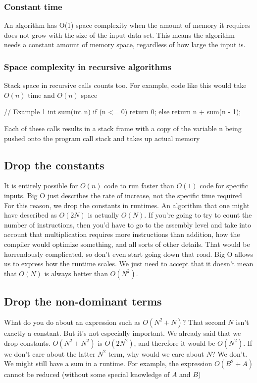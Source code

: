 \documentclass{report}
\begin{document}
    \subsubsection{Constant time}
    \bigbreak \noindent 
    An algorithm has O(1) space complexity when the amount of memory it requires does not grow with the size of the input data set. This means the algorithm needs a constant amount of memory space, regardless of how large the input is.

    \bigbreak \noindent 
    \subsubsection{Space complexity in recursive algorithms}
    \bigbreak \noindent 
    Stack space in recursive calls counts too. For example, code like this would take $O(n)$ time and $O(n)$ space
    \bigbreak \noindent 
    \begin{cppcode}
    // Example 1
    int sum(int n) {
    if (n <= 0) 
        return 0;
    else
        return n + sum(n - 1);
    }
    \end{cppcode}
    \bigbreak \noindent 
    Each of these calls results in a stack frame with a copy of the variable n being pushed onto the program call stack and takes up actual memory

    \pagebreak \bigbreak \noindent 
    \subsection{Drop the constants}
    \bigbreak \noindent 
    It is entirely possible for $O(n)$ code to run faster than $O(1)$ code for specific inputs. Big O just describes the rate of increase, not the specific time required
    \bigbreak \noindent 
    For this reason, we drop the constants in runtimes. An algorithm that one might have described as \(O(2N)\) is actually \(O(N)\). If you’re going to try to count the number of instructions, then you’d have to go to the assembly level and take into account that multiplication requires more instructions than addition, how the compiler would optimize something, and all sorts of other details. 
    \bigbreak \noindent 
    That would be horrendously complicated, so don’t even start going down that road. Big O allows us to express how the runtime scales. We just need to accept that it doesn’t mean that \(O(N)\) is always better than \(O(N^2)\).

    \bigbreak \noindent 
    \subsection{Drop the non-dominant terms}
    \bigbreak \noindent 
    What do you do about an expression such as \(O(N^2 + N)\)? That second \(N\) isn’t exactly a constant. But it’s not especially important. We already said that we drop constants. \(O(N^2 + N^2)\) is \(O(2N^2)\), and therefore it would be \(O(N^2)\). If we don’t care about the latter \(N^2\) term, why would we care about \(N\)? We don’t.
    \bigbreak \noindent 
    We might still have a sum in a runtime. For example, the expression $O(B^{2} + A)$ cannot be reduced (without some special knowledge of $A$ and $B$)
\end{document}
